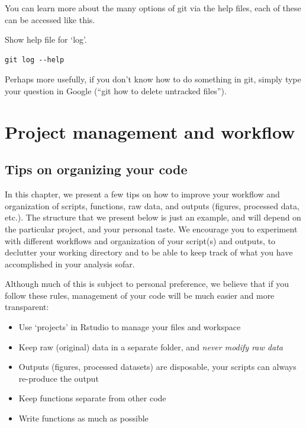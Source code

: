 \documentclass[]{book}
\providecommand{\tightlist}{%
  \setlength{\itemsep}{0pt}\setlength{\parskip}{0pt}}
\begin{document}
You can learn more about the many options of git via the help files, each of these can be accessed like this.

Show help file for `log'.

\begin{verbatim}
git log --help
\end{verbatim}

Perhaps more usefully, if you don't know how to do something in git, simply type your question in Google (``git how to delete untracked files'').

\hypertarget{projectman}{%
\chapter{Project management and workflow}\label{projectman}}

\hypertarget{tips-on-organizing-your-code}{%
\section{Tips on organizing your code}\label{tips-on-organizing-your-code}}

In this chapter, we present a few tips on how to improve your workflow and organization of scripts, functions, raw data, and outputs (figures, processed data, etc.). The structure that we present below is just an example, and will depend on the particular project, and your personal taste. We encourage you to experiment with different workflows and organization of your script(s) and outputs, to declutter your working directory and to be able to keep track of what you have accomplished in your analysis sofar.

Although much of this is subject to personal preference, we believe that if you follow these rules, management of your code will be much easier and more transparent:

\begin{itemize}
\tightlist
\item
  Use `projects' in Rstudio to manage your files and workspace
\item
  Keep raw (original) data in a separate folder, and \emph{never modify raw data}
\item
  Outputs (figures, processed datasets) are disposable, your scripts can always re-produce the output
\item
  Keep functions separate from other code
\item
  Write functions as much as possible
\end{itemize}
\end{document}
